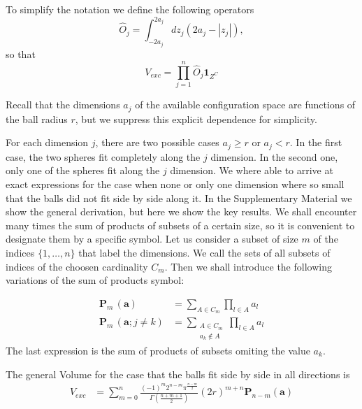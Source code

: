 \documentclass[superscriptaddress,pre,reprint,showpacs,twocolumn]{revtex4-1}
\newcommand{\sumprod}[1]{\mathbf{P}_{#1} \,}
\begin{document}
To simplify the notation we define the following operators
\begin{equation}
\hat{O}_j  = \int_{-2 a_j}^{2 a_j} dz_j \left( 2a_j -|z_j| \right), 
\end{equation}
so that
\begin{equation}\label{voloper}
V_{exc} = \prod_{j=1}^n \hat{O}_j \mathbf{1}_{Z^C}
\end{equation}

Recall that the dimensions $a_j$ of the available configuration space are functions of the ball radius $r$, 
but we suppress this explicit dependence for simplicity.

For each dimension $j$, there are two possible cases $a_j \geq r$ or $a_j < r$. In the first case, the two spheres fit completely along the $j$ dimension. In the second one, only one of the spheres fit along the $j$ dimension. We where able to arrive at
exact expressions for the case when none or only one dimension where so small that
the balls did not fit side by side along it. In the Supplementary Material we
show the general derivation, but here we show the key results.
We shall encounter many times the sum of products of subsets of a certain size,
so it is convenient to designate them by a specific symbol.
Let us consider a subset of size $m$ of the indices $\{1,\ldots, n\}$
that label the dimensions. We call the sets of all subsets of indices
of the choosen cardinality $C_m$. Then we shall introduce the following variations
 of the sum of products symbol:

 \begin{equation}
   \begin{aligned}
   \sumprod{m}(\mathbf{a}) & = \sum_{A \in C _m } \prod_{ l \in A } a_l \\
   \sumprod{m} (\mathbf{a}; j\neq k) & =
   \sum_{\substack{A \in  C _m \\ a_k \notin A} } \prod_{ l \in A } a_l
   \end{aligned}
 \end{equation}
The last expression is the sum of products of subsets omiting the
value $a_k$. 

The general Volume for the case that the balls fit side by side in all directions is
\begin{align}
V_{exc}  & =  \sum_{m=0}^{n}
 \frac{ (-1)^{m} 2^{n-m} \pi^\frac{n-m}{2}}{\Gamma \left( \frac{n+m + 1}{2}\right)} \left(2r\right)^{m+n}
 \mathbf{P}_{n-m}(\mathbf{a})
\end{align}
\end{document}
